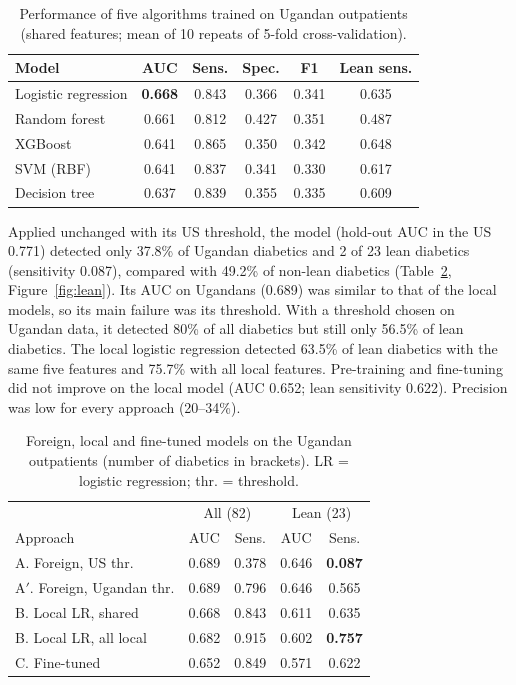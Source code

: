 \documentclass[11pt]{article}
\begin{document}
\begin{table}[t]
\centering\small
\begin{tabular}{@{}lccccc@{}}
\toprule
Model & AUC & Sens. & Spec. & F1 & Lean sens. \\
\midrule
Logistic regression & \textbf{0.668} & 0.843 & 0.366 & 0.341 & 0.635 \\
Random forest & 0.661 & 0.812 & 0.427 & 0.351 & 0.487 \\
XGBoost & 0.641 & 0.865 & 0.350 & 0.342 & 0.648 \\
SVM (RBF) & 0.641 & 0.837 & 0.341 & 0.330 & 0.617 \\
Decision tree & 0.637 & 0.839 & 0.355 & 0.335 & 0.609 \\
\bottomrule
\end{tabular}
\caption{Performance of five algorithms trained on Ugandan outpatients (shared features; mean of 10 repeats of 5-fold cross-validation).}
\label{tab:algorithms}
\end{table}

Applied unchanged with its US threshold, the  model (hold-out AUC in the US 0.771) detected only 37.8\% of Ugandan diabetics and 2 of 23 lean diabetics (sensitivity 0.087), compared with 49.2\% of non-lean diabetics (Table~\ref{tab:main}, Figure~\ref{fig:lean}). Its AUC on Ugandans (0.689) was similar to that of the local models, so its main failure was its threshold. With a threshold chosen on Ugandan data, it detected 80\% of all diabetics but still only 56.5\% of lean diabetics. The local logistic regression detected 63.5\% of lean diabetics with the same five features and 75.7\% with all local features. Pre-training and fine-tuning did not improve on the local model (AUC 0.652; lean sensitivity 0.622). Precision was low for every approach (20--34\%).

\begin{table}[t]
\centering\small
\begin{tabular}{@{}lcccc@{}}
\toprule
 & \multicolumn{2}{c}{All (82)} & \multicolumn{2}{c}{Lean (23)} \\
Approach & AUC & Sens. & AUC & Sens. \\
\midrule
A. Foreign, US thr. & 0.689 & 0.378 & 0.646 & \textbf{0.087} \\
A$'$. Foreign, Ugandan thr. & 0.689 & 0.796 & 0.646 & 0.565 \\
B. Local LR, shared & 0.668 & 0.843 & 0.611 & 0.635 \\
B. Local LR, all local & 0.682 & 0.915 & 0.602 & \textbf{0.757} \\
C. Fine-tuned & 0.652 & 0.849 & 0.571 & 0.622 \\
\bottomrule
\end{tabular}
\caption{Foreign, local and fine-tuned models on the Ugandan outpatients (number of diabetics in brackets). LR = logistic regression; thr. = threshold.}
\label{tab:main}
\end{table}
\end{document}
